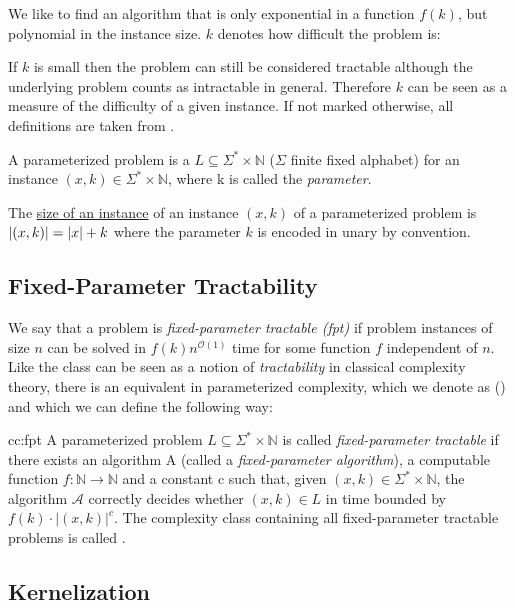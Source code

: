We like to find an algorithm that is only exponential in a function $f(k)$, but polynomial in the instance size.
$k$ denotes how difficult the problem is: 

If $k$ is small then the problem can still be considered tractable although the underlying \NPh problem counts as intractable in general.
Therefore $k$ can be seen as a measure of the difficulty of a given instance.
If not marked otherwise, all definitions are taken from \cite{Cygan2015}.


\begin{definition}
    A parameterized problem is a $L\subseteq\Sigma^*\times \mathbb{N}$ ($\Sigma$ finite fixed alphabet) for an instance $(x,k)\in \Sigma^*\times \mathbb{N}$, where k is called the \textit{parameter}.

    The \underline{size of an instance} of an instance $(x,k)$ of a parameterized problem is $\abs{(x,k)} = \abs{x} + k$ where the parameter $k$ is encoded in unary by convention.
\end{definition}

\subsection{Fixed-Parameter Tractability}
We say that a problem is \textit{fixed-parameter tractable (fpt)} if problem instances of size $n$ can be solved in $f(k)n^{\mathcal{O}(1)}$ time for some function $f$ independent of $n$. 
Like the class \Pt can be seen as a notion of \textit{tractability} in classical complexity theory, there is an equivalent in parameterized complexity, which we denote as \FPTl (\FPT) and which we can define the following way:

\begin{cc} {cc:fpt}
    A parameterized problem $L\subseteq\Sigma^*\times\mathbb{N}$ is called \textit{fixed-parameter tractable} if there exists an algorithm A (called a \textit{fixed-parameter algorithm}), a computable function $f:\mathbb{N} \rightarrow \mathbb{N}$ and a constant c such that, given $(x,k) \in \Sigma^* \times \mathbb{N}$, the algorithm $\mathcal{A}$ correctly decides whether $(x,k) \in L$ in time bounded by $f(k) \cdot |(x,k)|^c$. The complexity class containing all fixed-parameter tractable problems is called \FPT.
\end{cc}
\subsection{Kernelization}

